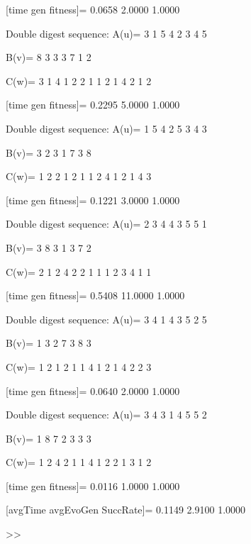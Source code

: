 [time gen fitness]=
    0.0658    2.0000    1.0000

Double digest sequence:
A(u)=
     3     1     5     4     2     3     4     5

B(v)=
     8     3     3     3     7     1     2

C(w)=
     3     1     4     1     2     2     1     1     2     1     4     2     1     2

[time gen fitness]=
    0.2295    5.0000    1.0000

Double digest sequence:
A(u)=
     1     5     4     2     5     3     4     3

B(v)=
     3     2     3     1     7     3     8

C(w)=
     1     2     2     1     2     1     1     2     4     1     2     1     4     3

[time gen fitness]=
    0.1221    3.0000    1.0000

Double digest sequence:
A(u)=
     2     3     4     4     3     5     5     1

B(v)=
     3     8     3     1     3     7     2

C(w)=
     2     1     2     4     2     2     1     1     1     2     3     4     1     1

[time gen fitness]=
    0.5408   11.0000    1.0000

Double digest sequence:
A(u)=
     3     4     1     4     3     5     2     5

B(v)=
     1     3     2     7     3     8     3

C(w)=
     1     2     1     2     1     1     4     1     2     1     4     2     2     3

[time gen fitness]=
    0.0640    2.0000    1.0000

Double digest sequence:
A(u)=
     3     4     3     1     4     5     5     2

B(v)=
     1     8     7     2     3     3     3

C(w)=
     1     2     4     2     1     1     4     1     2     2     1     3     1     2

[time gen fitness]=
    0.0116    1.0000    1.0000

[avgTime  avgEvoGen  SuccRate]=
    0.1149    2.9100    1.0000

>> 